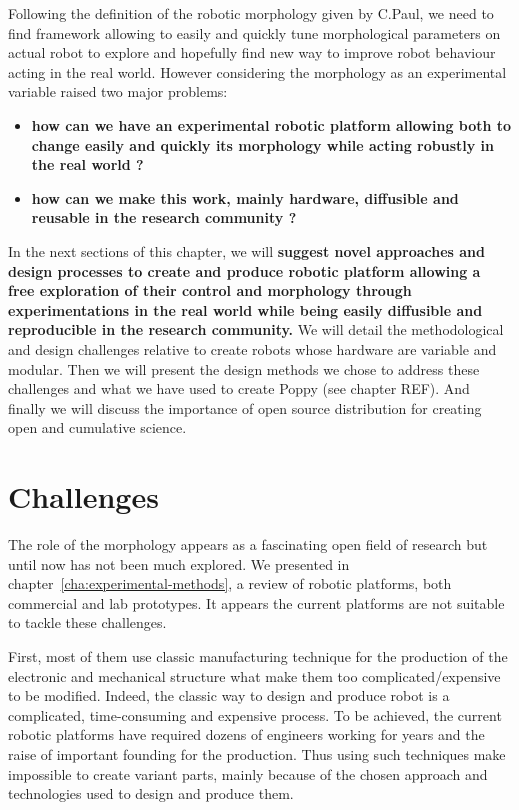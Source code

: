 Following the definition of the robotic morphology given by C.Paul, we need to find framework allowing to easily and quickly tune morphological parameters on actual robot to explore and hopefully find new way to improve robot behaviour acting in the real world. However considering the morphology as an experimental variable raised two major problems:
\begin{itemize}
    \item \textbf{how can we have an experimental robotic platform allowing both to change easily and quickly its morphology while acting robustly in the real world ? }
    \item \textbf{how can we make this work, mainly hardware, diffusible and reusable in the research community ?}
\end{itemize}

In the next sections of this chapter, we will \textbf{suggest novel approaches and design processes to create and produce robotic platform  allowing a free exploration of their control and morphology through experimentations in the real world while being easily diffusible and reproducible in the research community.}
We will detail the methodological and design challenges relative to create robots whose hardware are variable and modular. Then we will present the design methods we chose to address these challenges and what we have used to create Poppy (see chapter REF). And finally we will discuss the importance of open source distribution for creating open and cumulative science.


\section{Challenges} %

The role of the morphology appears as a fascinating open field of research but until now has not been much explored.
We presented in chapter~\ref{cha:experimental-methods}, a review of robotic platforms, both commercial and lab prototypes. It appears the current platforms are not suitable to tackle these challenges.

First, most of them use classic manufacturing technique for the production of the electronic and mechanical structure what make them too complicated/expensive to be modified. Indeed, the classic way to design and produce robot is a complicated, time-consuming and expensive process. To be achieved, the current robotic platforms have required dozens of engineers working for years and the raise of important founding for the production. Thus using such techniques make impossible to create variant parts, mainly because of the chosen approach and technologies used to design and produce them.



